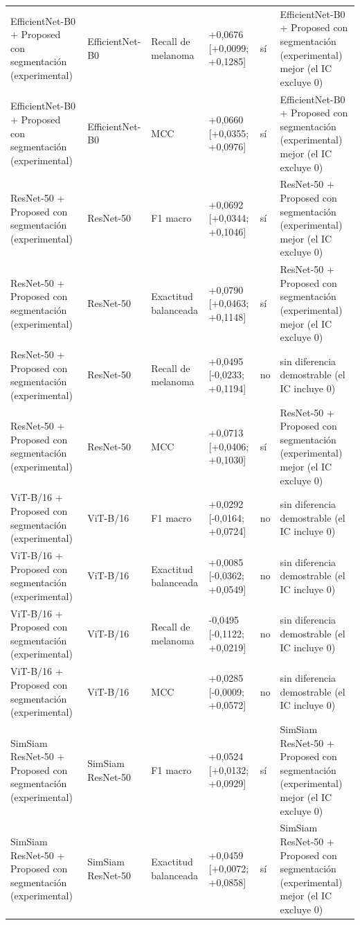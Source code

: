 \begin{longtable}{@{}llllll@{}}
EfficientNet-B0 + Proposed con segmentación (experimental) & EfficientNet-B0 & Recall de melanoma & +0,0676 [+0,0099; +0,1285] & sí & EfficientNet-B0 + Proposed con segmentación (experimental) mejor (el IC excluye 0) \\
EfficientNet-B0 + Proposed con segmentación (experimental) & EfficientNet-B0 & MCC & +0,0660 [+0,0355; +0,0976] & sí & EfficientNet-B0 + Proposed con segmentación (experimental) mejor (el IC excluye 0) \\
ResNet-50 + Proposed con segmentación (experimental) & ResNet-50 & F1 macro & +0,0692 [+0,0344; +0,1046] & sí & ResNet-50 + Proposed con segmentación (experimental) mejor (el IC excluye 0) \\
ResNet-50 + Proposed con segmentación (experimental) & ResNet-50 & Exactitud balanceada & +0,0790 [+0,0463; +0,1148] & sí & ResNet-50 + Proposed con segmentación (experimental) mejor (el IC excluye 0) \\
ResNet-50 + Proposed con segmentación (experimental) & ResNet-50 & Recall de melanoma & +0,0495 [-0,0233; +0,1194] & no & sin diferencia demostrable (el IC incluye 0) \\
ResNet-50 + Proposed con segmentación (experimental) & ResNet-50 & MCC & +0,0713 [+0,0406; +0,1030] & sí & ResNet-50 + Proposed con segmentación (experimental) mejor (el IC excluye 0) \\
ViT-B/16 + Proposed con segmentación (experimental) & ViT-B/16 & F1 macro & +0,0292 [-0,0164; +0,0724] & no & sin diferencia demostrable (el IC incluye 0) \\
ViT-B/16 + Proposed con segmentación (experimental) & ViT-B/16 & Exactitud balanceada & +0,0085 [-0,0362; +0,0549] & no & sin diferencia demostrable (el IC incluye 0) \\
ViT-B/16 + Proposed con segmentación (experimental) & ViT-B/16 & Recall de melanoma & -0,0495 [-0,1122; +0,0219] & no & sin diferencia demostrable (el IC incluye 0) \\
ViT-B/16 + Proposed con segmentación (experimental) & ViT-B/16 & MCC & +0,0285 [-0,0009; +0,0572] & no & sin diferencia demostrable (el IC incluye 0) \\
SimSiam ResNet-50 + Proposed con segmentación (experimental) & SimSiam ResNet-50 & F1 macro & +0,0524 [+0,0132; +0,0929] & sí & SimSiam ResNet-50 + Proposed con segmentación (experimental) mejor (el IC excluye 0) \\
SimSiam ResNet-50 + Proposed con segmentación (experimental) & SimSiam ResNet-50 & Exactitud balanceada & +0,0459 [+0,0072; +0,0858] & sí & SimSiam ResNet-50 + Proposed con segmentación (experimental) mejor (el IC excluye 0) \\

\end{longtable}
